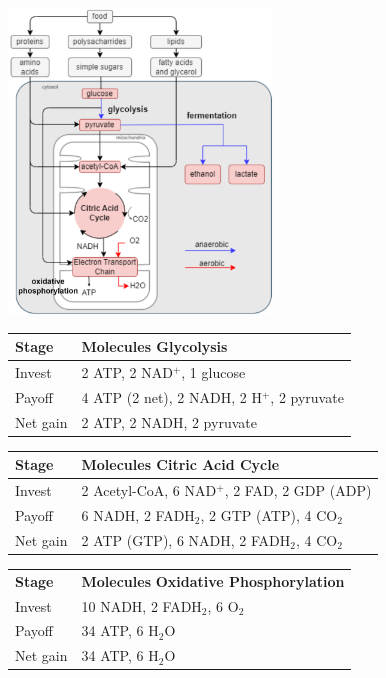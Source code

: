 \includegraphics[width=7cm]{src/Images/glucose_metabolism.png}\\ 

\begin{tabular}{l p{5cm}}
\textbf{Stage} & \textbf{Molecules} \hfill \textbf{Glycolysis}\\
\hline
Invest   & 2 ATP, 2 NAD\(^+\), 1 glucose \\
Payoff   & 4 ATP (2 net), 2 NADH, 2 H\(^+\), 2 pyruvate \\
Net gain & 2 ATP, 2 NADH, 2 pyruvate \\
\hline
\end{tabular}
\begin{tabular}{l p{5cm}}
\textbf{Stage} & \textbf{Molecules} \hfill \textbf{Citric Acid Cycle}\\
\hline
Invest   & 2 Acetyl-CoA, 6 NAD\(^+\), 2 FAD, 2 GDP (ADP) \\
Payoff   & 6 NADH, 2 FADH\(_2\), 2 GTP (ATP), 4 CO\(_2\) \\
Net gain & 2 ATP (GTP), 6 NADH, 2 FADH\(_2\), 4 CO\(_2\) \\
\hline
\end{tabular}
\begin{tabular}{l p{5cm}}
\textbf{Stage} & \textbf{Molecules} \hfill \textbf{Oxidative Phosphorylation}\\
Invest   & 10 NADH, 2 FADH\(_2\), 6 O\(_2\) \\
Payoff   & 34 ATP, 6 H\(_2\)O \\
Net gain & 34 ATP, 6 H\(_2\)O \\
\hline
\end{tabular}\\
